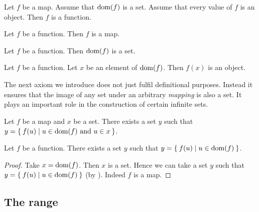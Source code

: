 \documentclass[../../set-theory.tex]{subfiles}
\begin{document}
  \begin{forthel}
    \begin{axiom}
      Let $f$ be a map.
      Assume that $\operatorname{dom}(f)$ is a set.
      Assume that every value of $f$ is an object.
      Then $f$ is a function.
    \end{axiom}

    \begin{axiom}
      Let $f$ be a function.
      Then $f$ is a map.
    \end{axiom}

    \begin{axiom}
      Let $f$ be a function.
      Then $\operatorname{dom}(f)$ is a set.
    \end{axiom}

    \begin{axiom}
      Let $f$ be a function.
      Let $x$ be an element of $\operatorname{dom}(f)$.
      Then $f(x)$ is an object.
    \end{axiom}
  \end{forthel}

  \noindent The next axiom we introduce does not just fulfil definitional
  purposes.
  Instead it ensures that the image of any set under an arbitrary
  \textit{mapping} is also a set.
  It plays an important role in the construction of certain infinite sets.

  \begin{forthel}
    \begin{axiom}[Replacement]\label{SetTheory_02_01_303432}
      Let $f$ be a map and $x$ be a set.
      There exists a set $y$ such that $y = \Set{f(u) | \text{$u \in \operatorname{dom}(f)$ and $u \in x$}}$.
    \end{axiom}

    \begin{corollary}\label{SetTheory_02_01_297906}
      Let $f$ be a function.
      There exists a set $y$ such that $y = \Set{f(u) | u \in \operatorname{dom}(f)}$.
    \end{corollary}
    \begin{proof}
      Take $x = \operatorname{dom}(f)$.
      Then $x$ is a set.
      Hence we can take a set $y$ such that $y = \Set{f(u) | u \in \operatorname{dom}(f)}$ (by ).
      Indeed $f$ is a map.
    \end{proof}
  \end{forthel}


  \subsection{The range}
\end{document}
